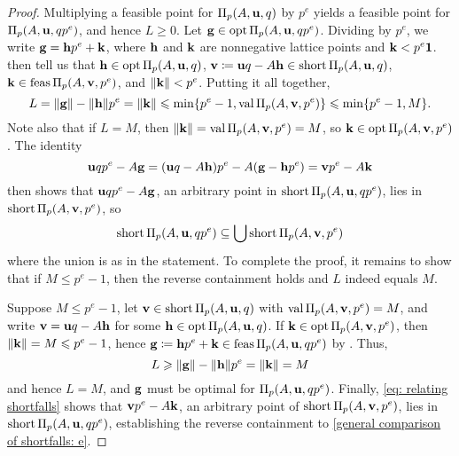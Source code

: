 \documentclass{amsart}
\begin{document}
\begin{proof}
   Multiplying a feasible point for $\Pi_p(A, \mathbf{u}, q)$ by $p^e$ yields a feasible point for $\Pi_p(A, \mathbf{u}, qp^e)$, and hence $L\geq 0$.
   Let $\mathbf{g} \in \operatorname{opt} \Pi_p(A, \mathbf{u}, qp^e)$.
   Dividing by $p^e$, we write $\mathbf{g} = \mathbf{h} p^e + \mathbf{k}$,
   where $\mathbf{h}$ and $\mathbf{k}$ are nonnegative lattice points and $\mathbf{k} < p^e \mathbf{1}$.
    then tell us that $\mathbf{h} \in \operatorname{opt} \Pi_p(A,\mathbf{u},q)$, $\mathbf{v} \coloneqq \mathbf{u}q - A \mathbf{h} \in \operatorname{short} \Pi_p(A,\mathbf{u},q)$, $\mathbf{k} \in \operatorname{feas} \Pi_p(A,\mathbf{v},p^e)$, and $\| \mathbf{k} \| < p^e$.
   Putting it all together, 
   \[ L = \| \mathbf{g} \|-\| \mathbf{h} \|p^e = \| \mathbf{k} \| \leqslant \min \{ p^e-1, \operatorname{val} \Pi_p(A, \mathbf{v}, p^e) \} \leqslant \min \{ p^e-1, M \}.\]
   Note also that if $L=M$, then $\| \mathbf{k} \| = \operatorname{val} \Pi_p(A,\mathbf{v},p^e) = M$, so $\mathbf{k} \in \operatorname{opt}\Pi_p(A,\mathbf{v},p^e)$.
   The identity
   \begin{equation}
      \label{eq: relating shortfalls}
      \mathbf{u}qp^e-A \mathbf{g} =
      (\mathbf{u}q-A\mathbf{h})p^e-A(\mathbf{g}-\mathbf{h}p^e) = 
      \mathbf{v}p^e-A\mathbf{k}
   \end{equation}
   then shows that $\mathbf{u}qp^e-A \mathbf{g}$, an arbitrary point in $\operatorname{short}\Pi_p(A, \mathbf{u},q p^e)$, lies in $\operatorname{short} \Pi_p(A, \mathbf{v},p^e)$, so
   \begin{equation}
      \label{general comparison of shortfalls: e}
      \operatorname{short} \Pi_p(A, \mathbf{u}, qp^e) \subseteq \bigcup \operatorname{short} \Pi_p(A, \mathbf{v}, p^e)
   \end{equation}
   where the union is as in the statement.
   To complete the proof, it remains to show that if $M\le p^e-1$, then the reverse containment holds and $L$ indeed equals  $M$.
   
   Suppose $M \le p^e-1$, let $\mathbf{v} \in \operatorname{short} \Pi_p(A, \mathbf{u}, q)$ with $\operatorname{val}\Pi_p(A,\mathbf{v},p^e)=M$, and write $\mathbf{v} = \mathbf{u}q - A \mathbf{h}$ for some $\mathbf{h} \in \operatorname{opt} \Pi_p(A, \mathbf{u}, q)$.
   If $\mathbf{k} \in \operatorname{opt} \Pi_p(A, \mathbf{v}, p^e)$, then $\| \mathbf{k} \| = M \leqslant p^e-1$, hence  $\mathbf{g} \coloneqq \mathbf{h} p^e + \mathbf{k} \in \operatorname{feas} \Pi_p(A,\mathbf{u},qp^e)$ by .
   Thus,
   \[ L \geqslant \| \mathbf{g} \| - \| \mathbf{h} \|p^e = \| \mathbf{k} \| = M \]
   and hence $L=M$, and $\mathbf{g}$ must be optimal for $\Pi_p(A,\mathbf{u},qp^e)$.
   Finally, \eqref{eq: relating shortfalls} shows that $\mathbf{v}p^e - A\mathbf{k}$, an arbitrary point of $\operatorname{short} \Pi_p(A,\mathbf{v},p^e)$, lies in $\operatorname{short}\Pi_p(A,\mathbf{u},qp^e)$, establishing the reverse containment to \eqref{general comparison of shortfalls: e}.
\end{proof}
\end{document}
